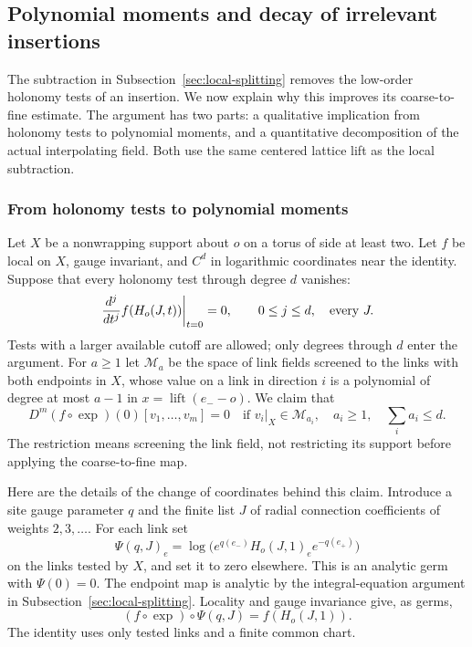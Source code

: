 \subsection{Polynomial moments and decay of irrelevant insertions}
\label{sec:polynomial-moment-attenuation}
The subtraction in Subsection~\ref{sec:local-splitting} removes the
low-order holonomy tests of an insertion. We now explain why this
improves its coarse-to-fine estimate. The argument has two parts:
a qualitative implication from holonomy tests to polynomial moments,
and a quantitative decomposition of the actual interpolating field.
Both use the same centered lattice lift as the local subtraction.

\subsubsection{From holonomy tests to polynomial moments}
Let $X$ be a nonwrapping support about $o$ on a torus of side at
least two. Let $f$ be local on $X$, gauge invariant, and $C^d$ in
logarithmic coordinates near the identity. Suppose that every
holonomy test through degree $d$ vanishes:
\begin{equation}\label{eq:moment-test-null}
 \left.\frac{d^j}{dt^j} f(H_o(J,t))\right|_{t=0}=0,
                   \qquad 0\le j\le d,\quad\hbox{every }J.
\end{equation}
Tests with a larger available cutoff are allowed; only degrees
through $d$ enter the argument. For $a\ge1$ let $\mathcal M_a$
be the space of link fields screened to the links with both
endpoints in $X$, whose value on a link in direction $i$ is a
polynomial of degree at most $a-1$ in
$x=\operatorname{lift}(e_--o)$. We claim that
\begin{equation}\label{eq:polynomial-moment-null}
 D^m(f\circ\exp)(0)[v_1,\ldots,v_m]=0
 \quad\text{if }v_i|_X\in\mathcal M_{a_i},\quad
 a_i\ge1,\quad\sum_i a_i\le d.
\end{equation}
The restriction means screening the link field, not restricting
its support before applying the coarse-to-fine map.

Here are the details of the change of coordinates behind this
claim. Introduce a site gauge parameter $q$ and the finite list
$J$ of radial connection coefficients of weights $2,3,\ldots$.
For each link set
\[
 \Psi(q,J)_e=
 \log\bigl(e^{q(e_-)}H_o(J,1)_e e^{-q(e_+)}\bigr)
\]
on the links tested by $X$, and set it to zero elsewhere. This
is an analytic germ with $\Psi(0)=0$. The endpoint map is analytic
by the integral-equation argument in Subsection~\ref{sec:local-splitting}.
Locality and gauge invariance give, as germs,
\begin{equation}\label{eq:moment-gauge-germ}
            (f\circ\exp)\circ\Psi(q,J)=f(H_o(J,1)).
\end{equation}
The identity uses only tested links and a finite common chart.

